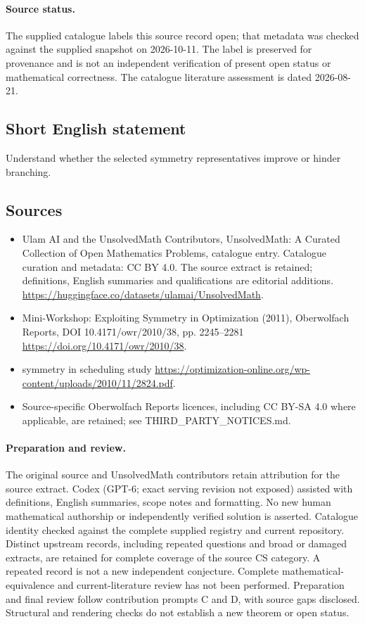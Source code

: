 \documentclass[11pt]{article}
\begin{document}
\paragraph{Source status.}
The supplied catalogue labels this source record open; that metadata was checked against the supplied snapshot on 2026-10-11. The label is preserved for provenance and is not an independent verification of present open status or mathematical correctness. The catalogue literature assessment is dated 2026-08-21.
\subsection{Short English statement}
Understand whether the selected symmetry representatives improve or hinder branching.
\subsection{Sources}
\begin{itemize}
\item[S1] Ulam AI and the UnsolvedMath Contributors, UnsolvedMath: A Curated Collection of Open Mathematics Problems, catalogue entry. Catalogue curation and metadata: CC BY 4.0. The source extract is retained; definitions, English summaries and qualifications are editorial additions.
\url{https://huggingface.co/datasets/ulamai/UnsolvedMath}.
\item[S2] Mini-Workshop: Exploiting Symmetry in Optimization (2011), Oberwolfach Reports, DOI 10.4171/owr/2010/38, pp. 2245--2281
\url{https://doi.org/10.4171/owr/2010/38}.
\item[S3] symmetry in scheduling study
\url{https://optimization-online.org/wp-content/uploads/2010/11/2824.pdf}.
\item Source-specific Oberwolfach Reports licences, including CC BY-SA 4.0 where applicable, are retained; see THIRD\_PARTY\_NOTICES.md.
\end{itemize}
\paragraph{Preparation and review.}
The original source and UnsolvedMath contributors retain attribution for the source extract. Codex (GPT-6; exact serving revision not exposed) assisted with definitions, English summaries, scope notes and formatting. No new human mathematical authorship or independently verified solution is asserted. Catalogue identity checked against the complete supplied registry and current repository. Distinct upstream records, including repeated questions and broad or damaged extracts, are retained for complete coverage of the source CS category. A repeated record is not a new independent conjecture. Complete mathematical-equivalence and current-literature review has not been performed. Preparation and final review follow contribution prompts C and D, with source gaps disclosed. Structural and rendering checks do not establish a new theorem or open status.
\label{end:statement}
\end{document}

